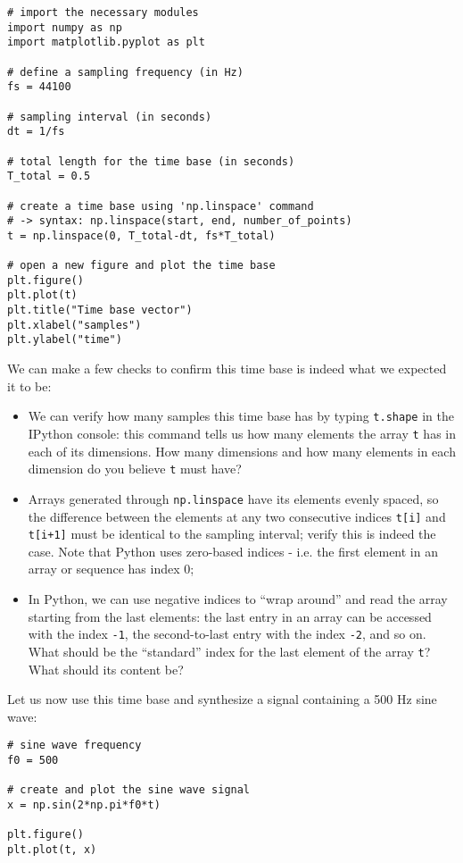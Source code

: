 \begin{lstlisting}[frame=single]
# import the necessary modules
import numpy as np
import matplotlib.pyplot as plt

# define a sampling frequency (in Hz)
fs = 44100

# sampling interval (in seconds)
dt = 1/fs

# total length for the time base (in seconds)
T_total = 0.5

# create a time base using 'np.linspace' command
# -> syntax: np.linspace(start, end, number_of_points)
t = np.linspace(0, T_total-dt, fs*T_total)

# open a new figure and plot the time base
plt.figure()
plt.plot(t)
plt.title("Time base vector")
plt.xlabel("samples")
plt.ylabel("time")
\end{lstlisting}

We can make a few checks to confirm this time base is indeed what we expected it to be:

\begin{itemize}
	\item We can verify how many samples this time base has by typing {\tt t.shape} in the IPython console: this command tells us how many elements the array {\tt t} has in each of its dimensions. How many dimensions and how many elements in each dimension do you believe {\tt t} must have?
	\item Arrays generated through {\tt np.linspace} have its elements evenly spaced, so the difference between the elements at any two consecutive indices {\tt t[i]} and {\tt t[i+1]} must be identical to the sampling interval; verify this is indeed the case. Note that Python uses zero-based indices - i.e. the first element in an array or sequence has index 0;
	\item In Python, we can use negative indices to ``wrap around'' and read the array starting from the last elements: the last entry in an array can be accessed with the index {\tt -1}, the second-to-last entry with the index {\tt -2}, and so on. What should be the ``standard'' index for the last element of the array {\tt t}? What should its content be?
\end{itemize}

Let us now use this time base and synthesize a signal containing a 500 Hz sine wave:

\begin{lstlisting}[frame=single]
# sine wave frequency
f0 = 500

# create and plot the sine wave signal
x = np.sin(2*np.pi*f0*t)

plt.figure()
plt.plot(t, x)
\end{lstlisting}

